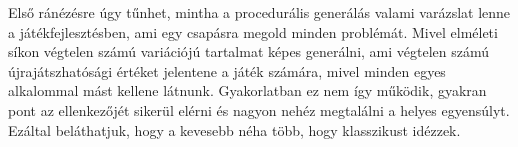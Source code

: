 \newline
\newline Első ránézésre úgy tűnhet, mintha a procedurális generálás valami varázslat lenne a játékfejlesztésben, ami egy csapásra megold minden problémát. Mivel elméleti síkon végtelen számú variációjú tartalmat képes generálni, ami végtelen számú újrajátszhatósági értéket jelentene a játék számára, mivel minden egyes alkalommal mást kellene látnunk.
\newline
\newline Gyakorlatban ez nem így működik, gyakran pont az ellenkezőjét sikerül elérni és nagyon nehéz megtalálni a helyes egyensúlyt. Ezáltal beláthatjuk, hogy a kevesebb néha több, hogy klasszikust idézzek.

